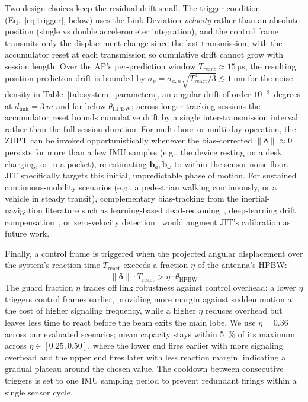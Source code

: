\documentclass[fleqn,10pt]{wlscirep}
\newcommand{\rev}[1]{#1}
\begin{document}
\rev{Two design choices keep the residual drift small. The trigger condition (Eq.~\ref{eq:trigger}, below) uses the Link Deviation \emph{velocity} rather than an absolute position (single vs double accelerometer integration), and the control frame transmits only the displacement change since the last transmission, with the accumulator reset at each transmission so cumulative drift cannot grow with session length. Over the AP's per-prediction window $T_{\text{react}} \approx \SI{15}{\micro\second}$, the resulting position-prediction drift is bounded by $\sigma_{p} = \sigma_{a,n}\sqrt{T_{\text{react}}^{3}/3} \lesssim \SI{1}{\nano\meter}$ for the noise density in Table~\ref{tab:system_parameters}, an angular drift of order $10^{-8}$~degrees at $d_{\text{link}} = \SI{3}{m}$ and far below $\theta_{\text{HPBW}}$; across longer tracking sessions the accumulator reset bounds cumulative drift by a single inter-transmission interval rather than the full session duration. \rev{For multi-hour or multi-day operation, the ZUPT can be invoked opportunistically whenever the bias-corrected $\|\dot{\boldsymbol{\delta}}\| \approx 0$ persists for more than a few IMU samples (e.g., the device resting on a desk, charging, or in a pocket), re-estimating $\mathbf{b}_a, \mathbf{b}_\omega$ to within the sensor noise floor.} JIT specifically targets this initial, unpredictable phase of motion. For sustained continuous-mobility scenarios (e.g., a pedestrian walking continuously, or a vehicle in steady transit), complementary bias-tracking from the inertial-navigation literature such as learning-based dead-reckoning~\cite{Brossard2020AIIMU}, deep-learning drift compensation~\cite{Chen2024DLInertial}, or zero-velocity detection~\cite{Skog2010ZUPT} would augment JIT's calibration as future work.}

Finally, a control frame is triggered when the projected angular displacement over the system's reaction time $T_{\text{react}}$ exceeds a fraction $\eta$ of the antenna's HPBW:
\begin{equation}
    \|\dot{\boldsymbol{\delta}}\| \cdot T_{\text{react}} > \eta \cdot \theta_{\text{HPBW}}
    \rev{\label{eq:trigger}}
\end{equation}
The guard fraction $\eta$ trades off link robustness against control overhead: a lower $\eta$ triggers control frames earlier, providing more margin against sudden motion at the cost of higher signaling frequency, while a higher $\eta$ reduces overhead but leaves less time to react before the beam exits the main lobe. We use $\eta = 0.36$ across our evaluated scenarios; \rev{mean capacity stays within \SI{5}{\percent} of its maximum across $\eta \in [0.25, 0.50]$, where the lower end fires earlier with more signaling overhead and the upper end fires later with less reaction margin, indicating a gradual plateau around the chosen value. The cooldown between consecutive triggers is set to one IMU sampling period to prevent redundant firings within a single sensor cycle.}
\end{document}
